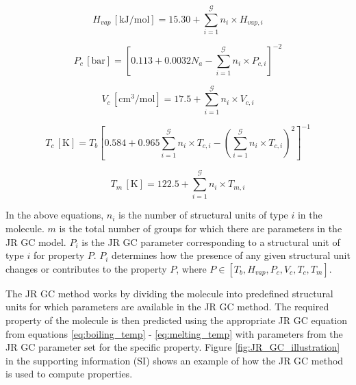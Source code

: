 \documentclass[journal=jacsat,manuscript=article, ]{achemso}
\begin{document}
\begin{equation}
    H_{vap} \, [\text{kJ/mol}] = 15.30 + \sum_{i=1}^{\mathcal{G}} n_{i} \times H_{vap,i}
    \label{eq:enthalpy_vap}
\end{equation}


\begin{equation}
    P_c \, [\text{bar}] = \left[ 0.113 + 0.0032 N_a - \sum_{i=1}^{\mathcal{G}} n_{i} \times P_{c,i} \right]^{-2}
    \label{eq:critical_pressure}
\end{equation}

\begin{equation}
    V_c \, [\text{cm}^3/\text{mol}] = 17.5 + \sum_{i=1}^{\mathcal{G}} n_{i} \times V_{c,i}
    \label{eq:critical_mol_vol}
\end{equation}

\begin{equation}
    T_c \, [\text{K}] = T_b \left[ 0.584 + 0.965 \sum_{i=1}^{\mathcal{G}} n_{i} \times T_{c,i} - \left( \sum_{i=1}^{\mathcal{G}} n_{i} \times T_{c,i} \right)^2 \right]^{-1}
    \label{eq:critical_temperature}
\end{equation}


\begin{equation}
    T_m \, [\text{K}] = 122.5 + \sum_{i=1}^{\mathcal{G}} n_{i} \times T_{m,i}
    \label{eq:melting_temp}
\end{equation}

In the above equations, $n_{i}$ is the number of structural units of type $i$ in the molecule. $m$ is the total number of groups for which there are parameters in the JR GC model.  ${P}_i$ is the JR GC parameter corresponding to a structural unit of type $i$ for property ${P}$.  ${P}_i$ determines how the presence of any given structural unit changes or contributes to the property ${P}$, where ${P} \in [T_b, H_{vap}, P_c,V_c, T_c, T_m]$.

The JR GC method works by dividing the molecule into predefined structural units for which parameters are available in the JR GC method. 
The required property of the molecule is then predicted using the appropriate JR GC equation from equations \ref{eq:boiling_temp} - \ref{eq:melting_temp} with parameters from the JR GC parameter set for the specific property. Figure \ref{fig:JR_GC_illustration} in the supporting information (SI) shows an example of how the JR GC method is used to compute properties.

\end{document}

